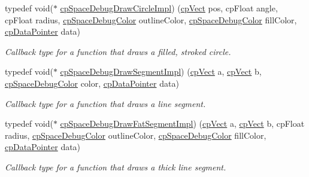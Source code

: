 \begin{DoxyCompactItemize}
\mbox{\label{group__cpSpace_gab96ab3199114538fa70cb5f7c6b2887a}} 
typedef void($\ast$ \hyperlink{group__cpSpace_gab96ab3199114538fa70cb5f7c6b2887a}{cp\+Space\+Debug\+Draw\+Circle\+Impl}) (\hyperlink{structcpVect}{cp\+Vect} pos, cp\+Float angle, cp\+Float radius, \hyperlink{structcpSpaceDebugColor}{cp\+Space\+Debug\+Color} outline\+Color, \hyperlink{structcpSpaceDebugColor}{cp\+Space\+Debug\+Color} fill\+Color, \hyperlink{group__basicTypes_ga2ac2c3c31e21893941f9e4f8ee279447}{cp\+Data\+Pointer} data)
\begin{DoxyCompactList}\small\item\em Callback type for a function that draws a filled, stroked circle. \end{DoxyCompactList}\item 
\mbox{\label{group__cpSpace_gaed387c6356be81f3da4050547fe47c9e}} 
typedef void($\ast$ \hyperlink{group__cpSpace_gaed387c6356be81f3da4050547fe47c9e}{cp\+Space\+Debug\+Draw\+Segment\+Impl}) (\hyperlink{structcpVect}{cp\+Vect} a, \hyperlink{structcpVect}{cp\+Vect} b, \hyperlink{structcpSpaceDebugColor}{cp\+Space\+Debug\+Color} color, \hyperlink{group__basicTypes_ga2ac2c3c31e21893941f9e4f8ee279447}{cp\+Data\+Pointer} data)
\begin{DoxyCompactList}\small\item\em Callback type for a function that draws a line segment. \end{DoxyCompactList}\item 
\mbox{\label{group__cpSpace_gab8b2b1f7036daa38914a0d3c2cb1d732}} 
typedef void($\ast$ \hyperlink{group__cpSpace_gab8b2b1f7036daa38914a0d3c2cb1d732}{cp\+Space\+Debug\+Draw\+Fat\+Segment\+Impl}) (\hyperlink{structcpVect}{cp\+Vect} a, \hyperlink{structcpVect}{cp\+Vect} b, cp\+Float radius, \hyperlink{structcpSpaceDebugColor}{cp\+Space\+Debug\+Color} outline\+Color, \hyperlink{structcpSpaceDebugColor}{cp\+Space\+Debug\+Color} fill\+Color, \hyperlink{group__basicTypes_ga2ac2c3c31e21893941f9e4f8ee279447}{cp\+Data\+Pointer} data)
\begin{DoxyCompactList}\small\item\em Callback type for a function that draws a thick line segment. \end{DoxyCompactList}\item 
\mbox{\label{group__cpSpace_ga2138e846816a1e581a3433740a596ab6}} 

\end{DoxyCompactItemize}
